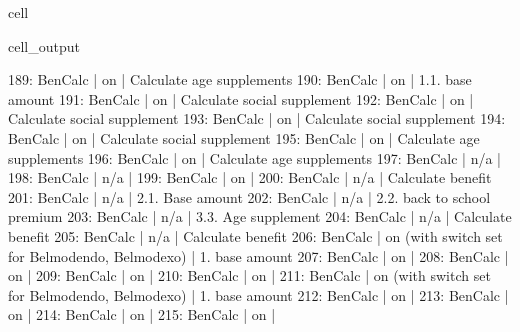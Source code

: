 \documentclass[letterpaper,10pt,english]{sphinxmanual}
\begin{document}
\begin{sphinxuseclass}{cell}
\begin{sphinxuseclass}{cell_output}
\begin{sphinxVerbatim}[commandchars=\\\{\}]
189: BenCalc     | on                                                       |    Calculate age supplements 
190: BenCalc     | on                                                       |    1.1. base amount 
191: BenCalc     | on                                                       |    Calculate social supplement 
192: BenCalc     | on                                                       |    Calculate social supplement 
193: BenCalc     | on                                                       |    Calculate social supplement 
194: BenCalc     | on                                                       |    Calculate social supplement 
195: BenCalc     | on                                                       |    Calculate age supplements 
196: BenCalc     | on                                                       |    Calculate age supplements 
197: BenCalc     | n/a                                                      |     
198: BenCalc     | n/a                                                      |     
199: BenCalc     | on                                                       |     
200: BenCalc     | n/a                                                      |    Calculate benefit 
201: BenCalc     | n/a                                                      |    2.1. Base amount 
202: BenCalc     | n/a                                                      |    2.2. back to school premium 
203: BenCalc     | n/a                                                      |    3.3. Age supplement 
204: BenCalc     | n/a                                                      |    Calculate benefit 
205: BenCalc     | n/a                                                      |    Calculate benefit 
206: BenCalc     | on (with switch set for Belmod\PYGZus{}endo, Belmod\PYGZus{}exo)         |    1.  base amount 
207: BenCalc     | on                                                       |     
208: BenCalc     | on                                                       |     
209: BenCalc     | on                                                       |     
210: BenCalc     | on                                                       |     
211: BenCalc     | on (with switch set for Belmod\PYGZus{}endo, Belmod\PYGZus{}exo)         |    1.  base amount 
212: BenCalc     | on                                                       |     
213: BenCalc     | on                                                       |     
214: BenCalc     | on                                                       |     
215: BenCalc     | on                                                       |     

\end{sphinxVerbatim}
\end{sphinxuseclass}
\end{sphinxuseclass}
\end{document}
